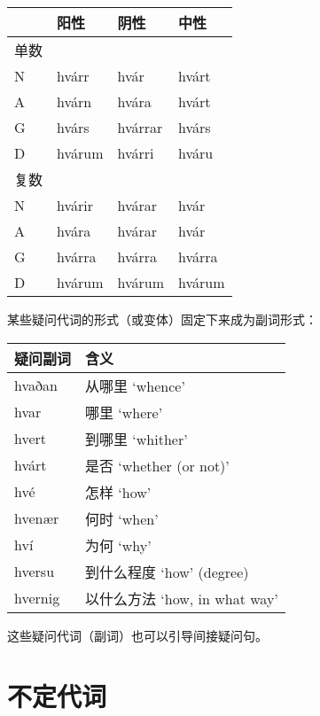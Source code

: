 \begin{introduction}[章节要点]
\begin{longtable}{llll}
    \toprule
         & 阳性   & 阴性    & 中性   \\
    \midrule
    \endhead
    \bottomrule
    \endfoot
    单数 &        &         &        \\
    N    & hvárr  & hvár    & hvárt  \\
    A    & hvárn  & hvára   & hvárt  \\
    G    & hvárs  & hvárrar & hvárs  \\
    D    & hvárum & hvárri  & hváru  \\
    复数 &        &         &        \\
    N    & hvárir & hvárar  & hvár   \\
    A    & hvára  & hvárar  & hvár   \\
    G    & hvárra & hvárra  & hvárra \\
    D    & hvárum & hvárum  & hvárum \\
\end{longtable}

某些疑问代词的形式（或变体）固定下来成为副词形式：

\begin{longtable}{ll}
    \toprule
    疑问副词 & 含义                          \\
    \midrule
    \endhead
    \bottomrule
    \endfoot
    hvaðan   & 从哪里 `whence‌'               \\
    hvar     & 哪里 `where‌'                  \\
    hvert    & 到哪里 `whither‌'              \\
    hvárt    & 是否 `whether (or not)‌'       \\
    hvé      & 怎样 `how‌'                    \\
    hvenær   & 何时 `when‌'                   \\
    hví      & 为何 `why‌'                    \\
    hversu   & 到什么程度 `how‌' (degree)     \\
    hvernig  & 以什么方法 `how, in what way‌' \\
\end{longtable}

这些疑问代词（副词）也可以引导间接疑问句。

\section{不定代词}\label{不定代词}


\end{introduction}
